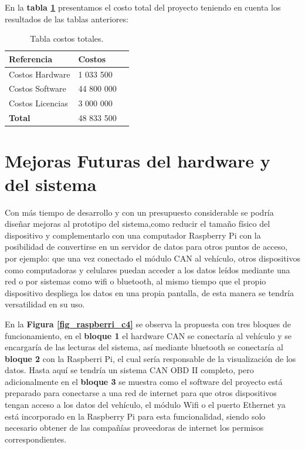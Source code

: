En la \textbf{tabla \ref{tabla:total}} presentamos el costo total del proyecto teniendo en cuenta los resultados de las tablas anteriores: 

\begin{table}[H]
\begin{center}
\begin{tabular}{|l|l|l}
\hline
\textbf{Referencia} & \textbf{Costos}  \\ \hline

Costos Hardware  & 1 033 500     \\ \hline
Costos Software  & 44 800 000     \\ \hline
Costos Licencias & 3 000 000     \\ \hline

\textbf{Total} & 48 833 500    \\ \hline
\end{tabular}
\caption{Tabla costos totales.}
\label{tabla:total}
\end{center}
\end{table}


\section{Mejoras Futuras del hardware y del sistema}
Con más tiempo de desarrollo y con un presupuesto considerable se podría diseñar mejoras al prototipo del sistema,como reducir el tamaño físico del dispositivo y complementarlo con una computador Raspberry Pi con la posibilidad de convertirse en un servidor de datos para otros puntos de acceso, por ejemplo: que una vez conectado el módulo CAN al vehículo, otros dispositivos como computadoras y celulares puedan acceder a los datos leídos mediante una red o por sistemas como wifi o bluetooth, al mismo tiempo que el propio dispositivo despliega los datos en una propia pantalla, de esta manera se tendría versatilidad en su uso. 

En la \textbf{ Figura \ref{fig_raspberri_c4}} se observa la propuesta con tres bloques de funcionamiento, en el \textbf{bloque 1} el hardware CAN se conectaría al vehículo y se encargaría de las lecturas del sistema, así mediante bluetooth se conectaría al \textbf{bloque 2} con la Raspberri Pi, el cual sería responsable de la visualización de los datos. Hasta aquí se tendría un sistema CAN OBD II completo, pero adicionalmente en el \textbf{bloque 3} se muestra como el software del proyecto está preparado para conectarse a una red de internet para que otros dispositivos tengan acceso a los datos del vehículo, el módulo Wifi o el puerto Ethernet ya está incorporado en la Raspberry Pi para esta funcionalidad, siendo solo necesario obtener  de las compañías proveedoras de internet los permisos correspondientes. 

